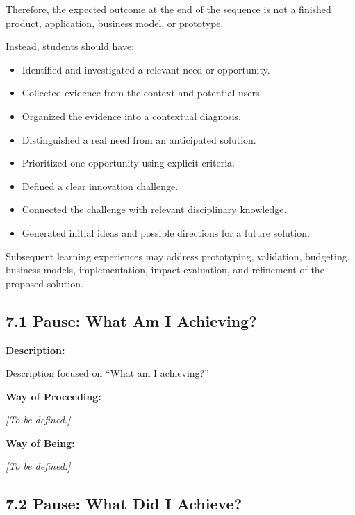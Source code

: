 \documentclass[12pt,a4paper]{article}
\newcommand{\placeholder}[1]{
	\textit{\textcolor{secondary}{[#1]}}
}
\begin{document}
	Therefore, the expected outcome at the end of the sequence is not a finished product, application, business model, or prototype.
	
	Instead, students should have:
	
	\begin{itemize}
		\item Identified and investigated a relevant need or opportunity.
		\item Collected evidence from the context and potential users.
		\item Organized the evidence into a contextual diagnosis.
		\item Distinguished a real need from an anticipated solution.
		\item Prioritized one opportunity using explicit criteria.
		\item Defined a clear innovation challenge.
		\item Connected the challenge with relevant disciplinary knowledge.
		\item Generated initial ideas and possible directions for a future solution.
	\end{itemize}
	
	Subsequent learning experiences may address prototyping, validation, budgeting, business models, implementation, impact evaluation, and refinement of the proposed solution.
	
	
	
	\subsection{7.1 Pause: What Am I Achieving?}
	
	\textbf{Description:}
	
	Description focused on ``What am I achieving?''
	
	\vspace{0.3cm}
	
	\textbf{Way of Proceeding:}
	
	\placeholder{To be defined.}
	
	\textbf{Way of Being:}
	
	\placeholder{To be defined.}
	
	
	\subsection{7.2 Pause: What Did I Achieve?}
	
\end{document}
